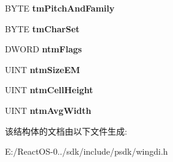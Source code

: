 \begin{DoxyCompactItemize}
\item 
\mbox{\label{structtag_n_e_w_t_e_x_t_m_e_t_r_i_c_w_ad6ab95b1e06fb30377a65a7ed1f2f1a4}} 
B\+Y\+TE {\bfseries tm\+Pitch\+And\+Family}
\item 
\mbox{\label{structtag_n_e_w_t_e_x_t_m_e_t_r_i_c_w_af23d82f69467f3b4a1f1401248812623}} 
B\+Y\+TE {\bfseries tm\+Char\+Set}
\item 
\mbox{\label{structtag_n_e_w_t_e_x_t_m_e_t_r_i_c_w_a63ccb5d493243936a11f28820c978f49}} 
D\+W\+O\+RD {\bfseries ntm\+Flags}
\item 
\mbox{\label{structtag_n_e_w_t_e_x_t_m_e_t_r_i_c_w_ab317e562a129ddae8654061881ca98e9}} 
U\+I\+NT {\bfseries ntm\+Size\+EM}
\item 
\mbox{\label{structtag_n_e_w_t_e_x_t_m_e_t_r_i_c_w_a1ef5bbf2a4dd5b3ab0069d210605f644}} 
U\+I\+NT {\bfseries ntm\+Cell\+Height}
\item 
\mbox{\label{structtag_n_e_w_t_e_x_t_m_e_t_r_i_c_w_a1a98bf65afb4ff3106b7dd9af745e512}} 
U\+I\+NT {\bfseries ntm\+Avg\+Width}
\end{DoxyCompactItemize}


该结构体的文档由以下文件生成\+:\begin{DoxyCompactItemize}
\item 
E\+:/\+React\+O\+S-\/0../sdk/include/psdk/wingdi.\+h\end{DoxyCompactItemize}
